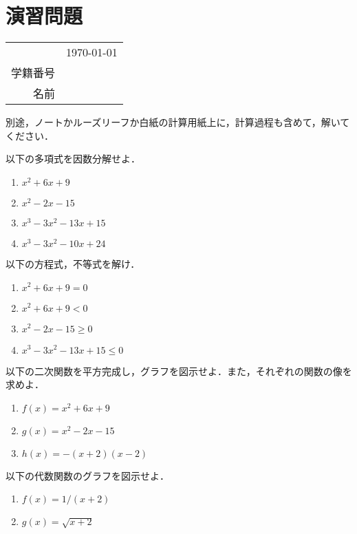 \section*{演習問題}
\begin{table}[!t]
	\begin{flushright}
		\begin{tabular}{rc}
			& \usdate\today \\
			学籍番号 & \\
			名前 & \\
		\end{tabular}
	\end{flushright}
\end{table}

別途，ノートかルーズリーフか白紙の計算用紙上に，計算過程も含めて，解いてください．

\begin{question}
	以下の多項式を因数分解せよ．
	\begin{enumerate}
		\item $x^2+6x+9$
		\item $x^2-2x-15$
		\item $x^3 - 3 x^2 - 13 x + 15$
		\item $x^3 - 3 x^2 - 10 x + 24$
	\end{enumerate}
\end{question}

\begin{question}
	以下の方程式，不等式を解け．
	\begin{enumerate}
		\item $x^2+6x+9 = 0$
		\item $x^2+6x+9 < 0$
		\item $x^2-2x-15 \geq 0$
		\item $x^3 - 3 x^2 - 13 x + 15 \leq 0$
	\end{enumerate}
\end{question}

\begin{question}
	以下の二次関数を平方完成し，グラフを図示せよ．また，それぞれの関数の像を求めよ．
	\begin{enumerate}
		\item $f(x) = x^2+6x+9$
		\item $g(x) = x^2-2x-15$
		\item $h(x) = -(x+2)(x-2)$
	\end{enumerate}
\end{question}

\begin{question}
	以下の代数関数のグラフを図示せよ．
	\begin{enumerate}
		\item $f(x) = 1/(x+2)$
		\item $g(x) = \sqrt{x+2}$
	\end{enumerate}
\end{question}

